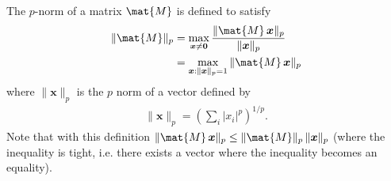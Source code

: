 \documentclass{sotonExamBoxes}    %
\newcommand{\bra}[1]{\left(#1\right)}
\newcommand{\len}[1]{\| #1 \|}
\begin{document}
\begin{question}{10}
  The $p$-norm of a matrix $\mat{M}$ is defined to satisfy
  \begin{align}
    \len{\mat{M}}_p &= \max_{\bm{x}\neq \bm{0}}
    \frac{\len{\mat{M}\,\bm{x}}_p}{\len{\bm{x}}_p} \\
    &= \max_{\bm{x}:\len{\bm{x}}_p=1}\len{\mat{M}\,\bm{x}}_p \label{eq:pnorm2}
  \end{align}
  where $\len{\bm{x}}_p$ is the $p$ norm of a vector defined by
  \begin{align*}
    \len{\bm{x}}_p = \bra{ \sum_i |x_i|^p}^{1/p}.
  \end{align*}
  Note that with this definition $\len{\mat{M}\,\bm{x}}_p \leq
  \len{\mat{M}}_p \, \len{\bm{x}}_p$ (where the inequality is tight,
  i.e. there exists a vector where the inequality becomes an
  equality).
    


\end{question}
\end{document}
